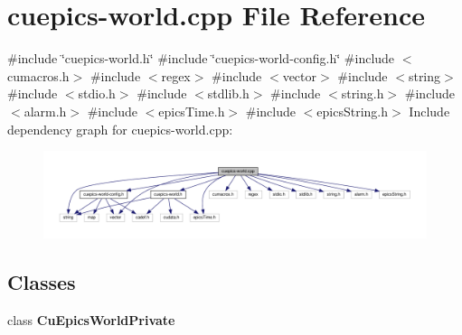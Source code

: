 \section{cuepics-\/world.cpp File Reference}
\label{cuepics-world_8cpp}
{\ttfamily \#include \char`\"{}cuepics-\/world.\+h\char`\"{}}\newline
{\ttfamily \#include \char`\"{}cuepics-\/world-\/config.\+h\char`\"{}}\newline
{\ttfamily \#include $<$cumacros.\+h$>$}\newline
{\ttfamily \#include $<$regex$>$}\newline
{\ttfamily \#include $<$vector$>$}\newline
{\ttfamily \#include $<$string$>$}\newline
{\ttfamily \#include $<$stdio.\+h$>$}\newline
{\ttfamily \#include $<$stdlib.\+h$>$}\newline
{\ttfamily \#include $<$string.\+h$>$}\newline
{\ttfamily \#include $<$alarm.\+h$>$}\newline
{\ttfamily \#include $<$epics\+Time.\+h$>$}\newline
{\ttfamily \#include $<$epics\+String.\+h$>$}\newline
Include dependency graph for cuepics-\/world.cpp\+:\nopagebreak
\begin{figure}[H]
\begin{center}
\leavevmode
\includegraphics[width=350pt]{cuepics-world_8cpp__incl}
\end{center}
\end{figure}
\subsection*{Classes}
\begin{DoxyCompactItemize}
\item 
class \textbf{ Cu\+Epics\+World\+Private}
\end{DoxyCompactItemize}
